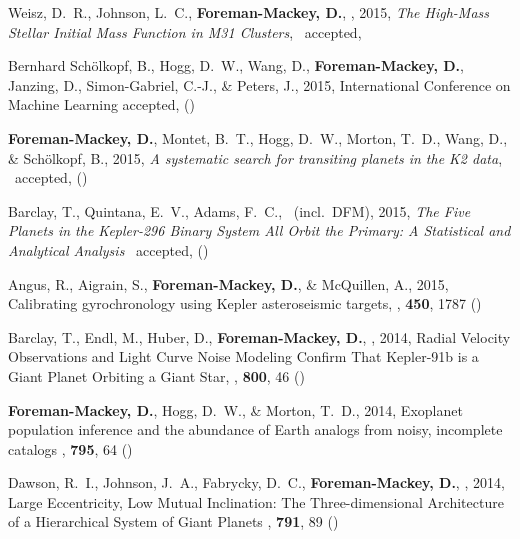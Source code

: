 \item Weisz, D.~R., Johnson, L.~C., {\bf Foreman-Mackey, D.}, \etal, 2015,
    \emph{The High-Mass Stellar Initial Mass Function in M31 Clusters},
    \apj\ accepted, 

\item Bernhard Sch\"olkopf, B., Hogg, D.~W., Wang, D., {\bf Foreman-Mackey,
    D.}, Janzing, D., Simon-Gabriel, C.-J., \& Peters, J., 2015,
    International Conference on Machine Learning accepted, ()

\item {\bf Foreman-Mackey, D.}, Montet, B.~T., Hogg, D.~W., Morton, T.~D.,
    Wang, D., \& Sch\"olkopf, B., 2015,
    \emph{A systematic search for transiting planets in the K2 data},
    \apj\ accepted, ()

\item Barclay, T., Quintana, E.~V., Adams, F.~C., \etal\ (incl.\ DFM), 2015,
    \emph{The Five Planets in the Kepler-296 Binary System All Orbit the
          Primary: A Statistical and Analytical Analysis}
    \apj\ accepted, ()

\item Angus, R., Aigrain, S., {\bf Foreman-Mackey, D.}, \& McQuillen, A., 2015,
        {Calibrating gyrochronology using Kepler asteroseismic targets},
    \mnras, \textbf{450}, 1787 ()

\item Barclay, T., Endl, M.,  Huber, D., {\bf Foreman-Mackey, D.}, \etal, 2014,
        {Radial Velocity Observations and Light Curve Noise Modeling Confirm
         That Kepler-91b is a Giant Planet Orbiting a Giant Star},
    \apj, \textbf{800}, 46 ()

\item {\bf Foreman-Mackey, D.}, Hogg, D.~W., \& Morton, T.~D., 2014,
        {Exoplanet population inference and the abundance of Earth analogs
         from noisy, incomplete catalogs}
    \apj, \textbf{795}, 64 ()

\item Dawson, R.~I., Johnson,  J.~A., Fabrycky, D.~C.,
    {\bf Foreman-Mackey, D.}, \etal, 2014,
        {Large Eccentricity, Low Mutual Inclination: The Three-dimensional
         Architecture of a Hierarchical System of Giant Planets}
    \apj, \textbf{791}, 89 ()

